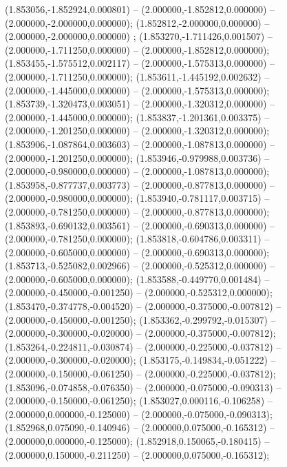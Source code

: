  (1.853056,-1.852924,0.000801) -- (2.000000,-1.852812,0.000000) -- (2.000000,-2.000000,0.000000);
 (1.852812,-2.000000,0.000000) -- (2.000000,-2.000000,0.000000) ;
 (1.853270,-1.711426,0.001507) -- (2.000000,-1.711250,0.000000) -- (2.000000,-1.852812,0.000000);
 (1.853455,-1.575512,0.002117) -- (2.000000,-1.575313,0.000000) -- (2.000000,-1.711250,0.000000);
 (1.853611,-1.445192,0.002632) -- (2.000000,-1.445000,0.000000) -- (2.000000,-1.575313,0.000000);
 (1.853739,-1.320473,0.003051) -- (2.000000,-1.320312,0.000000) -- (2.000000,-1.445000,0.000000);
 (1.853837,-1.201361,0.003375) -- (2.000000,-1.201250,0.000000) -- (2.000000,-1.320312,0.000000);
 (1.853906,-1.087864,0.003603) -- (2.000000,-1.087813,0.000000) -- (2.000000,-1.201250,0.000000);
 (1.853946,-0.979988,0.003736) -- (2.000000,-0.980000,0.000000) -- (2.000000,-1.087813,0.000000);
 (1.853958,-0.877737,0.003773) -- (2.000000,-0.877813,0.000000) -- (2.000000,-0.980000,0.000000);
 (1.853940,-0.781117,0.003715) -- (2.000000,-0.781250,0.000000) -- (2.000000,-0.877813,0.000000);
 (1.853893,-0.690132,0.003561) -- (2.000000,-0.690313,0.000000) -- (2.000000,-0.781250,0.000000);
 (1.853818,-0.604786,0.003311) -- (2.000000,-0.605000,0.000000) -- (2.000000,-0.690313,0.000000);
 (1.853713,-0.525082,0.002966) -- (2.000000,-0.525312,0.000000) -- (2.000000,-0.605000,0.000000);
 (1.853588,-0.449770,0.001484) -- (2.000000,-0.450000,-0.001250) -- (2.000000,-0.525312,0.000000);
 (1.853470,-0.374778,-0.004520) -- (2.000000,-0.375000,-0.007812) -- (2.000000,-0.450000,-0.001250);
 (1.853362,-0.299792,-0.015307) -- (2.000000,-0.300000,-0.020000) -- (2.000000,-0.375000,-0.007812);
 (1.853264,-0.224811,-0.030874) -- (2.000000,-0.225000,-0.037812) -- (2.000000,-0.300000,-0.020000);
 (1.853175,-0.149834,-0.051222) -- (2.000000,-0.150000,-0.061250) -- (2.000000,-0.225000,-0.037812);
 (1.853096,-0.074858,-0.076350) -- (2.000000,-0.075000,-0.090313) -- (2.000000,-0.150000,-0.061250);
 (1.853027,0.000116,-0.106258) -- (2.000000,0.000000,-0.125000) -- (2.000000,-0.075000,-0.090313);
 (1.852968,0.075090,-0.140946) -- (2.000000,0.075000,-0.165312) -- (2.000000,0.000000,-0.125000);
 (1.852918,0.150065,-0.180415) -- (2.000000,0.150000,-0.211250) -- (2.000000,0.075000,-0.165312);

